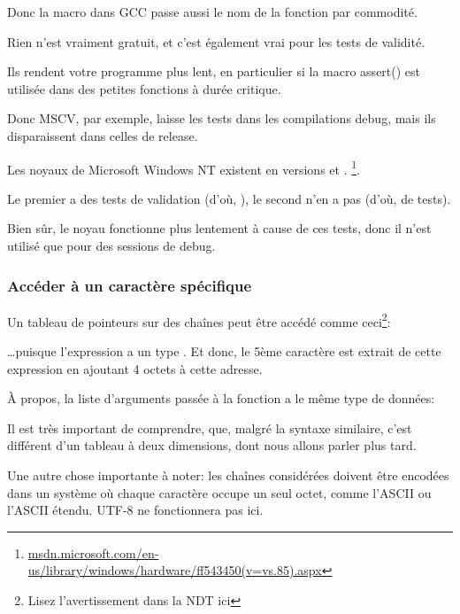 

Donc la macro dans GCC passe aussi le nom de la fonction par commodité.

Rien n'est vraiment gratuit, et c'est également vrai pour les tests de validité.

Ils rendent votre programme plus lent, en particulier si la macro assert() est utilisée
dans des petites fonctions à durée critique.

Donc MSCV, par exemple, laisse les tests dans les compilations debug, mais ils disparaissent
dans celles de release.

Les noyaux de Microsoft \gls{Windows NT} existent en versions  et .
\footnote{\href{http://go.yurichev.com/17259}{msdn.microsoft.com/en-us/library/windows/hardware/ff543450(v=vs.85).aspx}}.

Le premier a des tests de validation (d'où, ), le second n'en a pas (d'où,  de tests).

Bien sûr, le noyau  fonctionne plus lentement à cause de ces tests, donc
il n'est utilisé que pour des sessions de debug.


\subsubsection{Accéder à un caractère spécifique}

Un tableau de pointeurs sur des chaînes peut être accédé comme ceci\footnote{Lisez
l'avertissement dans la NDT ici }:



\dots puisque l'expression  a un type .
Et donc, le 5ème caractère est extrait de cette expression en ajoutant 4 octets à
cette adresse.

À propos, la liste d'arguments passée à la fonction  a le même type de
données:



Il est très important de comprendre, que, malgré la syntaxe similaire, c'est différent
d'un tableau à deux dimensions, dont nous allons parler plus tard.

Une autre chose importante à noter: les chaînes considérées doivent être encodées
dans un système où chaque caractère occupe un seul octet, comme l'\ac{ASCII} ou l'\ac{ASCII}
étendu.
UTF-8 ne fonctionnera pas ici.

